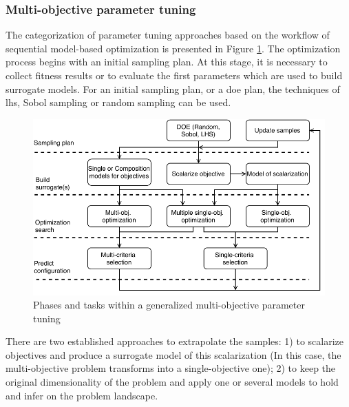        
        \subsubsection{Multi-objective parameter tuning}

            The categorization of parameter tuning approaches based on the workflow of sequential model-based optimization is presented in Figure \ref{fig:mo_param_tuning}. The optimization process begins with an initial sampling plan. At this stage, it is necessary to collect fitness results or to evaluate the first parameters which are used to build surrogate models. For an initial sampling plan, or a \gls{doe} plan, the techniques of \gls{lhs}, Sobol sampling or random sampling can be used.
            
            \begin{figure} 
                \centering
                \includegraphics[width=\textwidth]{content/images/tax_mb_tuning}
                \caption[Phases and tasks within a generalized multi-objective parameter tuning]{Phases and tasks within a generalized multi-objective parameter tuning}
                \label{fig:mo_param_tuning}
            \end{figure}

            There are two established approaches to extrapolate the samples: 1) to scalarize objectives and produce a surrogate model of this scalarization (In this case, the multi-objective problem transforms into a single-objective one); 2) to keep the original dimensionality of the problem and apply one or several models to hold and infer on the problem landscape.

